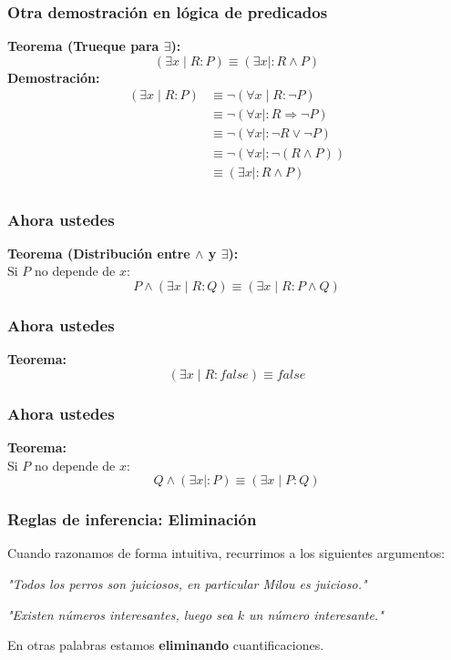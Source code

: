 \documentclass{beamer}
\newcommand{\then}{\Rightarrow}
\begin{document}
\begin{frame}[fragile]
    \frametitle{Otra demostración en lógica de predicados}
    \pause
    \textbf{Teorema (Trueque para $\exists$):}
    $$(\exists x \mid R : P) \equiv (\exists x \mid : R \land P)$$
    \pause
    \textbf{Demostración:} \\
    \pause
    \begin{align*}
        (\exists x \mid R : P) &\equiv \lnot (\forall x \mid R : \lnot P) \tag{De Morgan gen.}\\ 
        &\equiv \lnot (\forall x \mid : R \then \lnot P) \tag{trueque para $\forall$}\\
        &\equiv \lnot (\forall x \mid : \lnot R \lor \lnot P) \tag{definición $\then$}\\
        &\equiv \lnot (\forall x \mid : \lnot (R \land P)) \tag{De Morgan }\\
        &\equiv (\exists x \mid : R \land P) \tag{De Morgan gen.}\\
    \end{align*}
\end{frame}

\begin{frame}[fragile]
    \frametitle{Ahora ustedes}
    \pause
    \textbf{Teorema (Distribución entre $\land$ y $\exists$):} \\
    Si $P$ no depende de $x$:
    $$P \land (\exists x \mid R : Q) \equiv (\exists x \mid R : P \land Q)$$
    \vspace*{165 pt}
\end{frame}

\begin{frame}[fragile]
    \frametitle{Ahora ustedes}
    \pause
    \textbf{Teorema:} \\
    $$(\exists x \mid R : false) \equiv false$$
    \vspace*{165 pt}
\end{frame}

\begin{frame}[fragile]
    \frametitle{Ahora ustedes}
    \pause
    \textbf{Teorema:} \\
    Si $P$ no depende de $x$:
    $$Q \land (\exists x \mid : P) \equiv (\exists x \mid P : Q)$$
    \vspace*{165 pt}
\end{frame}

\begin{frame}[fragile]
    \frametitle{Reglas de inferencia: Eliminación}
    Cuando razonamos de forma intuitiva, recurrimos a los siguientes argumentos:
    \begin{center}
        \textit{"Todos los perros son juiciosos, en particular Milou es juicioso."}

        \vspace{10pt}

        \textit{"Existen números interesantes, luego sea $k$ un número interesante."}
    \end{center}
    En otras palabras estamos \textbf{eliminando} cuantificaciones.
\end{frame}
\end{document}
